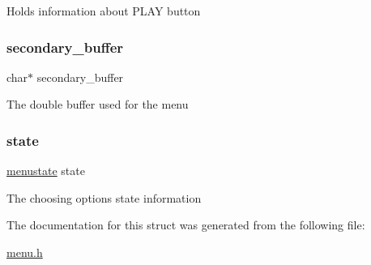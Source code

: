 Holds information about P\+L\+AY button \hypertarget{struct_menu_a1820f1e9a26c0253b13be1df94052ca1}{}\label{struct_menu_a1820f1e9a26c0253b13be1df94052ca1} 
\subsubsection{\texorpdfstring{secondary\+\_\+buffer}{secondary\_buffer}}
{\footnotesize\ttfamily char$\ast$ secondary\+\_\+buffer}

The double buffer used for the menu \hypertarget{struct_menu_aa42946365311ec5aa5a3ab71b9c52968}{}\label{struct_menu_aa42946365311ec5aa5a3ab71b9c52968} 
\subsubsection{\texorpdfstring{state}{state}}
{\footnotesize\ttfamily \hyperlink{group__menu_ga187fcd377cc0b403aaec48d4cfdc559a}{menustate} state}

The choosing options\textquotesingle{} state information 

The documentation for this struct was generated from the following file\+:\begin{DoxyCompactItemize}
\item 
\hyperlink{menu_8h}{menu.\+h}\end{DoxyCompactItemize}
